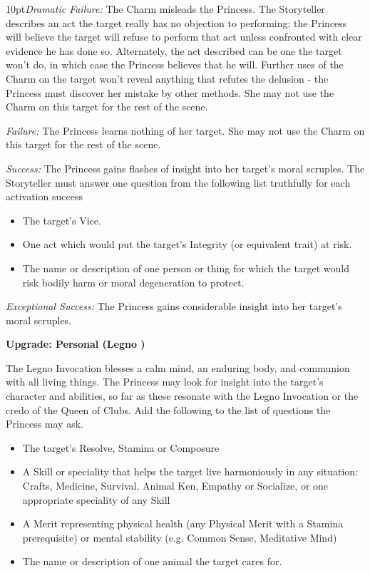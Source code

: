\begin{myindentpar}{10pt}\emph{Dramatic Failure:} The Charm misleads the Princess. The Storyteller describes an act the target really has no objection to performing; the Princess will believe the target will refuse to perform that act unless confronted with clear evidence he has done so. Alternately, the act described can be one the target won't do, in which case the Princess believes that he will. Further uses of the Charm on the target won't reveal anything that refutes the delusion - the Princess must discover her mistake by other methods. She may not use the Charm on this target for the rest of the scene.

\emph{Failure:} The Princess learns nothing of her target. She may not use the Charm on this target for the rest of the scene.

\emph{Success:} The Princess gains flashes of insight into her target's moral scruples. The Storyteller must answer one question from the following list truthfully for each activation success

\begin{itemize}
\item The target's Vice.
\item One act which would put the target's Integrity (or equivalent trait) at risk.
\item The name or description of one person or thing for which the target would risk bodily harm or moral degeneration to protect.
\end{itemize}

\emph{Exceptional Success:} The Princess gains considerable insight into her target's moral scruples.

\textbf{Upgrade: Personal (Legno \textbullet\textbullet)}

The Legno Invocation blesses a calm mind, an enduring body, and communion with all living things. The Princess may look for insight into the target's character and abilities, so far as these resonate with the Legno Invocation or the credo of the Queen of Clubs. Add the following to the list of questions the Princess may ask.

\begin{itemize}
 \item  The target's Resolve, Stamina or Composure
\item A Skill or speciality that helps the target live harmoniously in any situation: Crafts, Medicine, Survival, Animal Ken, Empathy or Socialize, or one appropriate speciality of any Skill
\item A Merit representing physical health (any Physical Merit with a Stamina prerequisite) or mental stability (e.g. Common Sense, Meditative Mind)
\item The name or description of one animal the target cares for.\end{itemize}\end{myindentpar}

